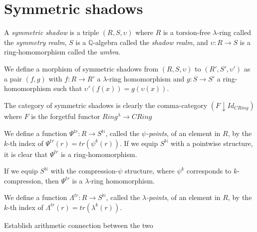
\section{Symmetric shadows}

\begin{definition}
  A \emph{symmetric shadow} is a triple $(R, S, \upsilon)$ where $R$ is a torsion-free $\lambda$-ring called the \emph{symmetry realm}, $S$ is a $\mathbb{Q}$-algebra called the \emph{shadow realm}, and $\upsilon: R \to S$ is a ring-homomorphism called the \emph{umbra}. 
\end{definition}

\begin{definition}
  We define a morphism of symmetric shadows from $(R, S, \upsilon)$ to $(R', S', \upsilon')$ as a pair $(f, g)$ with $f : R \to R'$ a $\lambda$-ring homomorphism and $g : S \to S'$ a ring-homomorphism such that $\upsilon'(f(x)) = g(\upsilon(x))$. 
\end{definition}

\begin{remark}
  The category of symmetric shadows is clearly the comma-category $(F \downarrow Id_{CRing})$ where $F$ is the forgetful functor $Ring^{\lambda} \to CRing$
\end{remark}

\begin{definition}
  We define a function $\Psi^{tr} : R \to S^{\mathbb{N}}$, called the \emph{$\psi$-points}, of an element in $R$, by the $k$-th index of $\Psi^{tr}(r) = tr(\psi^k(r))$. If we equip $S^{\mathbb{N}}$ with a pointwise structure, it is clear that $\Psi^{tr}$ is a ring-homomorphism. 
\end{definition}

\begin{proposition}
  If we equip $S^{\mathbb{N}}$ with the compression-$\psi$ structure, where $\psi^k$ corresponds to $k$-compression, then $\Psi^{tr}$ is a $\lambda$-ring homomorphism.
\end{proposition}

\begin{definition}
    We define a function $\Lambda^{tr} : R \to S^{\mathbb{N}}$, called the \emph{$\lambda$-points}, of an element in $R$, by the $k$-th index of $\Lambda^{tr}(r) = tr(\lambda^k(r))$. 
\end{definition}

\begin{proposition} 
  Establish arithmetic connection between the two
\end{proposition}

